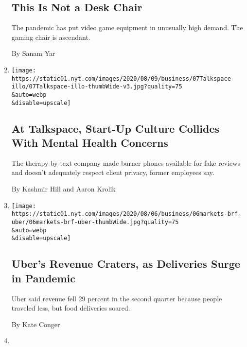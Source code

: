 \begin{enumerate}
  \hypertarget{this-is-not-a-desk-chair}{%
  \subsection{This Is Not a Desk Chair}\label{this-is-not-a-desk-chair}}

  The pandemic has put video game equipment in unusually high demand.
  The gaming chair is ascendant.

  By Sanam Yar
\item
  \href{/2020/08/07/technology/talkspace.html}{}

  \texttt{[image: https://static01.nyt.com/images/2020/08/09/business/07Talkspace-illo/07Talkspace-illo-thumbWide-v3.jpg?quality=75\\\&auto=webp\\\&disable=upscale]}

  \hypertarget{at-talkspace-start-up-culture-collides-with-mental-health-concerns}{%
  \subsection{At Talkspace, Start-Up Culture Collides With Mental Health
  Concerns}\label{at-talkspace-start-up-culture-collides-with-mental-health-concerns}}

  The therapy-by-text company made burner phones available for fake
  reviews and doesn't adequately respect client privacy, former
  employees say.

  By Kashmir Hill and Aaron Krolik
\item
  \href{/2020/08/06/technology/uber-ride-hailing-delivery-coronavirus.html}{}

  \texttt{[image: https://static01.nyt.com/images/2020/08/06/business/06markets-brf-uber/06markets-brf-uber-thumbWide.jpg?quality=75\\\&auto=webp\\\&disable=upscale]}

  \hypertarget{ubers-revenue-craters-as-deliveries-surge-in-pandemic}{%
  \subsection{Uber's Revenue Craters, as Deliveries Surge in
  Pandemic}\label{ubers-revenue-craters-as-deliveries-surge-in-pandemic}}

  Uber said revenue fell 29 percent in the second quarter because people
  traveled less, but food deliveries soared.

  By Kate Conger
\item
  \href{/2020/08/06/style/influencer-parties-jake-paul-tana-mongeau-thomas-petrou-hype-house.html}{}


\end{enumerate}
